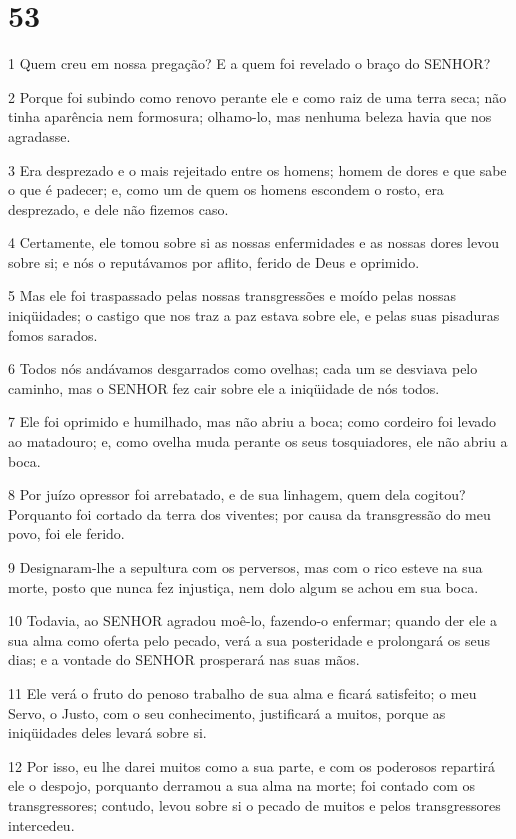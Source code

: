 \chapter{53}

\par 1 Quem creu em nossa pregação? E a quem foi revelado o braço do SENHOR?
\par 2 Porque foi subindo como renovo perante ele e como raiz de uma terra seca; não tinha aparência nem formosura; olhamo-lo, mas nenhuma beleza havia que nos agradasse.
\par 3 Era desprezado e o mais rejeitado entre os homens; homem de dores e que sabe o que é padecer; e, como um de quem os homens escondem o rosto, era desprezado, e dele não fizemos caso.
\par 4 Certamente, ele tomou sobre si as nossas enfermidades e as nossas dores levou sobre si; e nós o reputávamos por aflito, ferido de Deus e oprimido.
\par 5 Mas ele foi traspassado pelas nossas transgressões e moído pelas nossas iniqüidades; o castigo que nos traz a paz estava sobre ele, e pelas suas pisaduras fomos sarados.
\par 6 Todos nós andávamos desgarrados como ovelhas; cada um se desviava pelo caminho, mas o SENHOR fez cair sobre ele a iniqüidade de nós todos.
\par 7 Ele foi oprimido e humilhado, mas não abriu a boca; como cordeiro foi levado ao matadouro; e, como ovelha muda perante os seus tosquiadores, ele não abriu a boca.
\par 8 Por juízo opressor foi arrebatado, e de sua linhagem, quem dela cogitou? Porquanto foi cortado da terra dos viventes; por causa da transgressão do meu povo, foi ele ferido.
\par 9 Designaram-lhe a sepultura com os perversos, mas com o rico esteve na sua morte, posto que nunca fez injustiça, nem dolo algum se achou em sua boca.
\par 10 Todavia, ao SENHOR agradou moê-lo, fazendo-o enfermar; quando der ele a sua alma como oferta pelo pecado, verá a sua posteridade e prolongará os seus dias; e a vontade do SENHOR prosperará nas suas mãos.
\par 11 Ele verá o fruto do penoso trabalho de sua alma e ficará satisfeito; o meu Servo, o Justo, com o seu conhecimento, justificará a muitos, porque as iniqüidades deles levará sobre si.
\par 12 Por isso, eu lhe darei muitos como a sua parte, e com os poderosos repartirá ele o despojo, porquanto derramou a sua alma na morte; foi contado com os transgressores; contudo, levou sobre si o pecado de muitos e pelos transgressores intercedeu.

